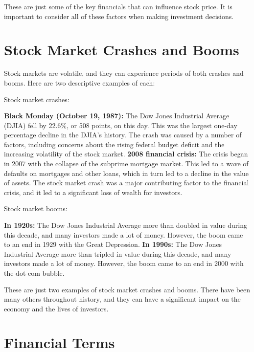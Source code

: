 These are just some of the key financials that can influence stock price. It is important to consider all of these factors when making investment decisions.


\section{Stock Market Crashes and Booms}

Stock markets are volatile, and they can experience periods of both crashes and booms. Here are two descriptive examples of each:

Stock market crashes:

\textbf{ Black Monday (October 19, 1987):} The Dow Jones Industrial Average (DJIA) fell by 22.6\%, or 508 points, on this day. This was the largest one-day percentage decline in the DJIA's history. The crash was caused by a number of factors, including concerns about the rising federal budget deficit and the increasing volatility of the stock market.
\textbf{ 2008 financial crisis:} The crisis began in 2007 with the collapse of the subprime mortgage market. This led to a wave of defaults on mortgages and other loans, which in turn led to a decline in the value of assets. The stock market crash was a major contributing factor to the financial crisis, and it led to a significant loss of wealth for investors.

Stock market booms:

\textbf{ In 1920s:} The Dow Jones Industrial Average more than doubled in value during this decade, and many investors made a lot of money. However, the boom came to an end in 1929 with the Great Depression.
\textbf{In 1990s:} The Dow Jones Industrial Average more than tripled in value during this decade, and many investors made a lot of money. However, the boom came to an end in 2000 with the dot-com bubble.

These are just two examples of stock market crashes and booms. There have been many others throughout history, and they can have a significant impact on the economy and the lives of investors.

\section{Financial Terms}

